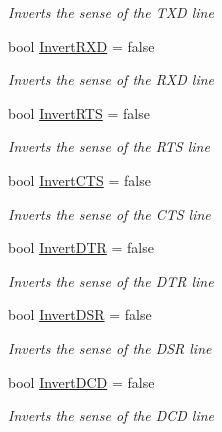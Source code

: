 \begin{DoxyCompactItemize}
\begin{DoxyCompactList}\small\item\em Inverts the sense of the T\+XD line \end{DoxyCompactList}\item 
bool \mbox{\hyperlink{class_f_t_d2_x_x___n_e_t_1_1_f_t_d_i_1_1_f_t232_r___e_e_p_r_o_m___s_t_r_u_c_t_u_r_e_ae41bc94a465045c8fb1b1056dfd10abc}{Invert\+R\+XD}} = false
\begin{DoxyCompactList}\small\item\em Inverts the sense of the R\+XD line \end{DoxyCompactList}\item 
bool \mbox{\hyperlink{class_f_t_d2_x_x___n_e_t_1_1_f_t_d_i_1_1_f_t232_r___e_e_p_r_o_m___s_t_r_u_c_t_u_r_e_a02599f5856cf8b738dec523294507a09}{Invert\+R\+TS}} = false
\begin{DoxyCompactList}\small\item\em Inverts the sense of the R\+TS line \end{DoxyCompactList}\item 
bool \mbox{\hyperlink{class_f_t_d2_x_x___n_e_t_1_1_f_t_d_i_1_1_f_t232_r___e_e_p_r_o_m___s_t_r_u_c_t_u_r_e_a8e6b6bfaa4dae0bee7881907283c4ae8}{Invert\+C\+TS}} = false
\begin{DoxyCompactList}\small\item\em Inverts the sense of the C\+TS line \end{DoxyCompactList}\item 
bool \mbox{\hyperlink{class_f_t_d2_x_x___n_e_t_1_1_f_t_d_i_1_1_f_t232_r___e_e_p_r_o_m___s_t_r_u_c_t_u_r_e_ab09575fa91fb1939ee779723b4554c45}{Invert\+D\+TR}} = false
\begin{DoxyCompactList}\small\item\em Inverts the sense of the D\+TR line \end{DoxyCompactList}\item 
bool \mbox{\hyperlink{class_f_t_d2_x_x___n_e_t_1_1_f_t_d_i_1_1_f_t232_r___e_e_p_r_o_m___s_t_r_u_c_t_u_r_e_a1fd164250554d26bde932beb344739da}{Invert\+D\+SR}} = false
\begin{DoxyCompactList}\small\item\em Inverts the sense of the D\+SR line \end{DoxyCompactList}\item 
bool \mbox{\hyperlink{class_f_t_d2_x_x___n_e_t_1_1_f_t_d_i_1_1_f_t232_r___e_e_p_r_o_m___s_t_r_u_c_t_u_r_e_a859362b846218f02300f0e5f0dc0697f}{Invert\+D\+CD}} = false
\begin{DoxyCompactList}\small\item\em Inverts the sense of the D\+CD line \end{DoxyCompactList}\item 

\end{DoxyCompactItemize}
